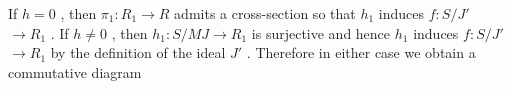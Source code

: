\begin{center}
\end{center}
If  $h = 0$  , then  $\pi_1 : R_1 \to R$  admits a cross-section so that  $h_1$  induces $f : S/J'$ $\to R_1$  . If  $h \neq 0$  , then  $h_1 : S/MJ \to R_1$  is surjective and hence  $h_1$ induces  $f : S/J'$ $\to R_1$  by the definition of the ideal  $J'$  . Therefore in either case we obtain a commutative diagram

